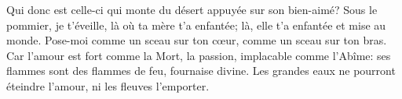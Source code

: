 Qui donc est celle-ci qui monte du désert appuyée sur son bien-aimé?
Sous le pommier, je t’éveille, là où ta mère t’a enfantée;
	là, elle t’a enfantée et mise au monde.
Pose-moi comme un sceau sur ton cœur, comme un sceau sur ton bras.
Car l’amour est fort comme la Mort, la passion, implacable comme l’Abîme:
	ses flammes sont des flammes de feu, fournaise divine.
Les grandes eaux ne pourront éteindre l’amour,
	ni les fleuves l’emporter.
